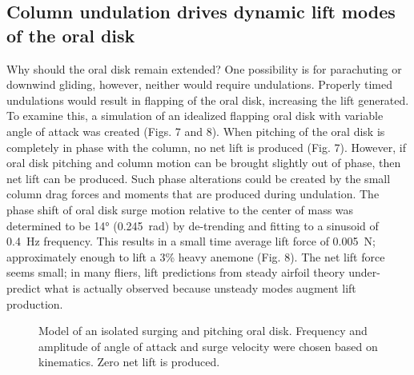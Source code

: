 \documentclass[10pt]{article}
\begin{document}
\subsection*{Column undulation drives dynamic lift modes of the oral disk}
	Why should the oral disk remain extended?  One possibility is for parachuting or downwind gliding, however, neither would require undulations.  Properly timed undulations would result in flapping of the oral disk, increasing the lift generated.  To examine this, a simulation of an idealized flapping oral disk with variable angle of attack was created (Figs. 7 and 8).  When pitching of the oral disk is completely in phase with the column, no net lift is produced (Fig. 7).  However, if oral disk pitching and column motion can be brought slightly out of phase, then net lift can be produced.  Such phase alterations could be created by the small column drag forces and moments that are produced during undulation.  The phase shift of oral disk surge motion relative to the center of mass was determined to be \ang{14} (\SI{0.245}{\radian}) by de-trending and fitting to a sinusoid of \SI{0.4}{\hertz} frequency.  This results in a small time average lift force of \SI{0.005}{\newton}; approximately enough to lift a 3\% heavy anemone (Fig. 8).  The net lift force seems small; in many fliers, lift predictions from steady airfoil theory under-predict what is actually observed because unsteady modes augment lift production.  
	
\begin{figure}
\caption{Model of an isolated surging and pitching oral disk.  Frequency and amplitude of angle of attack and surge velocity were chosen based on kinematics.  Zero net lift is produced.}
\label{fig:7}
\end{figure}
\end{document}

